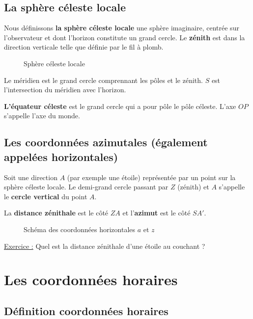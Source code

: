 \documentclass[12pt]{report}
\begin{document}
\section{La sphère céleste locale} 

Nous définissons \textbf{la sphère céleste locale} une sphère imaginaire, centrée sur l'observateur et dont l'horizon constitute un grand cercle. Le \textbf{zénith} est dans la direction verticale telle que définie par le fil à plomb.


\begin{figure}[ht]
\begin{center}
\end{center}
\caption{Sphère céleste locale}
\label{fig:14}
\end{figure}

Le méridien est le grand cercle comprennant les pôles et le zénith. $S$ est l'intersection du méridien avec l'horizon.

\textbf{L'équateur céleste} est le grand cercle qui a pour pôle le pôle céleste. L'axe $OP$ s'appelle l'axe du monde.


\section{Les coordonnées azimutales (également appelées horizontales)}

Soit une direction $A$ (par exemple une étoile) représentée par un point sur la sphère céleste locale. Le demi-grand cercle passant par $Z$ (zénith) et $A$ s'appelle le \textbf{cercle vertical} du point $A$. 

La \textbf{distance zénithale} est le côté $ZA$ et l'\textbf{azimut} est le côté $SA'$.


\begin{figure}[ht]
\begin{center}
\end{center}
\caption{Schéma des coordonnées horizontales $a$ et $z$}
\label{fig:15}
\end{figure}

\bigskip

\underline{Exercice :} Quel est la distance zénithale d'une étoile au couchant ?


\chapter{Les coordonnées horaires}
\section{Définition coordonnées horaires}
\end{document}
